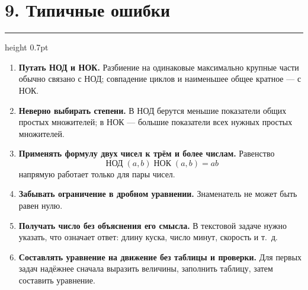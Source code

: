 \documentclass[a4paper,12pt]{article}
\newcommand{\sectionline}{%
  \par\vspace{0.1em}%
  {\color{accent}\hrule height 0.7pt}%
  \vspace{0.55em}}
\newcommand{\GCDru}{\mathop{\text{НОД}}\nolimits}
\newcommand{\LCMru}{\mathop{\text{НОК}}\nolimits}
\newenvironment{flowchartpage}{%
  \clearpage
  \thispagestyle{empty}%
}{%
  \clearpage
}
\begin{document}
\begin{flowchartpage}
\begin{center}
\end{center}

\end{flowchartpage}

\section*{9. Типичные ошибки}
\sectionline

\begin{enumerate}

  \item
  \textbf{Путать НОД и НОК.}
  Разбиение на одинаковые максимально крупные части
  обычно связано с НОД;
  совпадение циклов и наименьшее общее кратное ---
  с НОК.

  \item
  \textbf{Неверно выбирать степени.}
  В НОД берутся меньшие показатели
  общих простых множителей;
  в НОК --- большие показатели
  всех нужных простых множителей.

  \item
  \textbf{Применять формулу двух чисел
  к трём и более числам.}
  Равенство
  \[
  \GCDru(a,b)\LCMru(a,b)=ab
  \]
  напрямую работает только для пары чисел.

  \item
  \textbf{Забывать ограничение в дробном уравнении.}
  Знаменатель не может быть равен нулю.

  \item
  \textbf{Получать число без объяснения его смысла.}
  В текстовой задаче нужно указать,
  что означает ответ:
  длину куска, число минут, скорость и т.~д.

  \item
  \textbf{Составлять уравнение на движение
  без таблицы и проверки.}
  Для первых задач надёжнее сначала выразить величины,
  заполнить таблицу,
  затем составить уравнение.

\end{enumerate}
\end{document}
